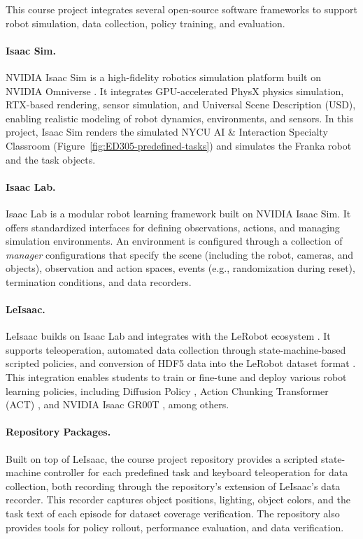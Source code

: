 \documentclass[11pt]{article}
\begin{document}
This course project integrates several open-source software frameworks to support robot simulation, data collection, policy training, and evaluation.

\paragraph{Isaac Sim.}
NVIDIA Isaac Sim \cite{isaacsim2026} is a high-fidelity robotics simulation platform built on NVIDIA Omniverse \cite{nvidia_omniverse_website}. It integrates GPU-accelerated PhysX physics simulation, RTX-based rendering, sensor simulation, and Universal Scene Description (USD), enabling realistic modeling of robot dynamics, environments, and sensors. In this project, Isaac Sim renders the simulated NYCU AI \& Interaction Specialty Classroom (Figure~\ref{fig:ED305-predefined-tasks}) and simulates the Franka robot and the task objects.

\paragraph{Isaac Lab.} Isaac Lab \cite{isaaclab,mittal2025isaaclab} is a modular robot learning framework built on NVIDIA Isaac Sim. It offers standardized interfaces for defining observations, actions, and managing simulation environments. An environment is configured through a collection of \emph{manager} configurations that specify the scene (including the robot, cameras, and objects), observation and action spaces, events (e.g., randomization during reset), termination conditions, and data recorders.

\paragraph{LeIsaac.}
LeIsaac \cite{leisaac} builds on Isaac Lab and integrates with the LeRobot ecosystem \cite{cadene2024lerobot}. It supports teleoperation, automated data collection through state-machine-based scripted policies, and conversion of HDF5 data into the LeRobot dataset format \cite{lerobot_dataset_v3}. This integration enables students to train or fine-tune and deploy various robot learning policies, including Diffusion Policy \cite{chi2023diffusionpolicy}, Action Chunking Transformer (ACT) \cite{zhao2023act}, and NVIDIA Isaac GR00T \cite{gr00tn1_2025}, among others.

\paragraph{Repository Packages.}
Built on top of LeIsaac, the course project repository provides a scripted state-machine controller for each predefined task and keyboard teleoperation for data collection, both recording through the repository's extension of LeIsaac's data recorder. This recorder captures object positions, lighting, object colors, and the task text of each episode for dataset coverage verification. The repository also provides tools for policy rollout, performance evaluation, and data verification.
\end{document}
